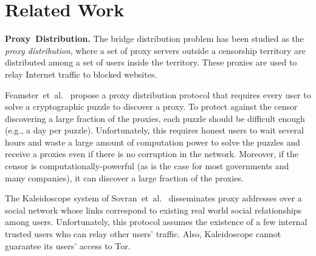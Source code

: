 \documentclass[letterpaper,twocolumn,10pt]{article}
\newcommand{\etal}{et~al.}
\newcommand{\eg}{e.g.}
\newcommand{\todo}[1]{{\leavevmode\color{blue}[TODO: #1]}}
\newcommand{\sfsize}{\fontsize{0.73\baselineskip}{0.73\baselineskip}\selectfont}
\newcommand{\sans}[1]{\textsf{\sfsize \mbox{#1}}}
\newcommand{\sansb}[1]{\textbf{\sans{\mbox{#1}}}}
\newcommand{\para}[1]{\vspace{0.55em} \noindent \sansb{{\mbox{#1}}}}
\begin{document}

\section{Related Work} \label{sec:relatedwork}
\para{Proxy Distribution.} The bridge distribution problem has been studied as the \emph{proxy distribution}, where a set of proxy servers outside a censorship territory are distributed among a set of users inside the territory. These proxies are used to relay Internet traffic to blocked websites. 


Feamster~\etal~\cite{Feamster:PETS:2003} propose a proxy distribution protocol that requires every user to solve a cryptographic puzzle to discover a proxy. To protect against the censor discovering a large fraction of the proxies, each puzzle should be difficult enough (\eg, a day per puzzle). Unfortunately, this requires honest users to wait several hours and waste a large amount of computation power to solve the puzzles and receive a proxies even if there is no corruption in the network. Moreover, if the censor is computationally-powerful (as is the case for most governments and many companies), it can discover a large fraction of the proxies.

The Kaleidoscope system of Sovran~\etal~\cite{Sovran:2008:PSN} disseminates proxy addresses over a social network whose links correspond to existing real world social relationships among users. Unfortunately, this protocol assumes the existence of a few internal trusted users who can relay other users' traffic. Also, Kaleidoscope cannot guarantee its users' access to Tor.
\end{document}
